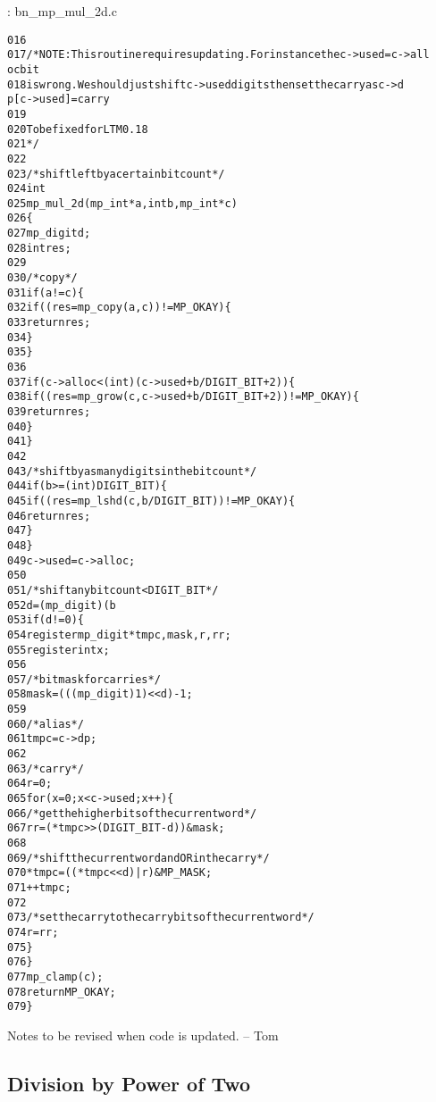 \documentclass[b5paper]{book}
\begin{document}
\vspace{+3mm}\begin{small}
\hspace{-5.1mm}{\bf File}: bn\_mp\_mul\_2d.c
\vspace{-3mm}
\begin{alltt}
016   
017   /* NOTE:  This routine requires updating.  For instance the c->used = c->all
      oc bit
018      is wrong.  We should just shift c->used digits then set the carry as c->d
      p[c->used] = carry
019    
020      To be fixed for LTM 0.18
021    */
022   
023   /* shift left by a certain bit count */
024   int
025   mp_mul_2d (mp_int * a, int b, mp_int * c)
026   \{
027     mp_digit d;
028     int      res;
029   
030     /* copy */
031     if (a != c) \{
032        if ((res = mp_copy (a, c)) != MP_OKAY) \{
033          return res;
034        \}
035     \}
036   
037     if (c->alloc < (int)(c->used + b/DIGIT_BIT + 2)) \{
038        if ((res = mp_grow (c, c->used + b / DIGIT_BIT + 2)) != MP_OKAY) \{
039          return res;
040        \}
041     \}
042   
043     /* shift by as many digits in the bit count */
044     if (b >= (int)DIGIT_BIT) \{
045       if ((res = mp_lshd (c, b / DIGIT_BIT)) != MP_OKAY) \{
046         return res;
047       \}
048     \}
049     c->used = c->alloc;
050   
051     /* shift any bit count < DIGIT_BIT */
052     d = (mp_digit) (b % DIGIT_BIT);
053     if (d != 0) \{
054       register mp_digit *tmpc, mask, r, rr;
055       register int x;
056   
057       /* bitmask for carries */
058       mask = (((mp_digit)1) << d) - 1;
059   
060       /* alias */
061       tmpc = c->dp;
062   
063       /* carry */
064       r    = 0;
065       for (x = 0; x < c->used; x++) \{
066         /* get the higher bits of the current word */
067         rr = (*tmpc >> (DIGIT_BIT - d)) & mask;
068   
069         /* shift the current word and OR in the carry */
070         *tmpc = ((*tmpc << d) | r) & MP_MASK;
071         ++tmpc;
072   
073         /* set the carry to the carry bits of the current word */
074         r = rr;
075       \}
076     \}
077     mp_clamp (c);
078     return MP_OKAY;
079   \}
\end{alltt}
\end{small}

Notes to be revised when code is updated. -- Tom

\subsection{Division by Power of Two}
\end{document}
